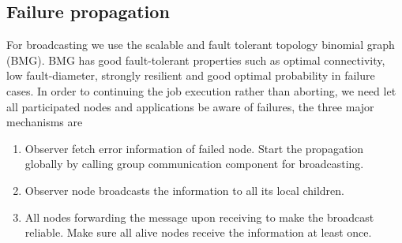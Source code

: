 \documentclass[sigconf]{acmart}
\begin{document}
\subsection{Failure propagation}
For broadcasting we use the scalable and fault tolerant topology binomial graph (BMG)\cite{Angskun07}. BMG has good fault-tolerant properties such as optimal connectivity, low fault-diameter, strongly resilient and good optimal probability in failure cases. In order to continuing the job execution rather than aborting, we need let all participated nodes and applications be aware of failures, the three major mechanisms are 
\begin{enumerate}
  \item Observer fetch error information of failed node. Start the propagation globally by calling group communication component for broadcasting.
  \item Observer node broadcasts the information to all its local children. 
  \item All nodes forwarding the message upon receiving to make the broadcast reliable. Make sure all alive nodes receive the information at least once. 
\end{enumerate}
\end{document}
